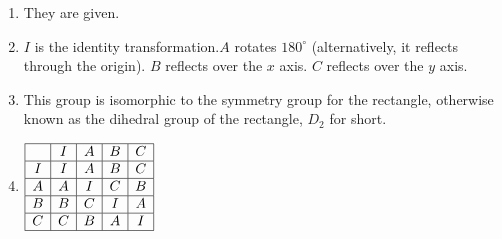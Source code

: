 \documentclass[../gatm.tex]{subfiles}
\begin{document}
\begin{enumerate}[label=(\alph*)]
\item They are given.
\item $I$ is the identity transformation.$A$ rotates $180^\circ$ (alternatively, it reflects through the origin). $B$ reflects over the $x$ axis. $C$ reflects over the $y$ axis.
\item This group is isomorphic to the symmetry group for the rectangle, otherwise known as the dihedral group of the rectangle, $D_2$ for short.
\item $\begin{array}{|c|c|c|c|c|}
\hline
& I & A & B & C \\ \hline
I & I & A & B & C \\ \hline
A & A & I & C & B \\ \hline
B & B & C & I & A \\ \hline 
C & C & B & A & I \\ \hline
\end{array}$
\end{enumerate}
\end{document}
